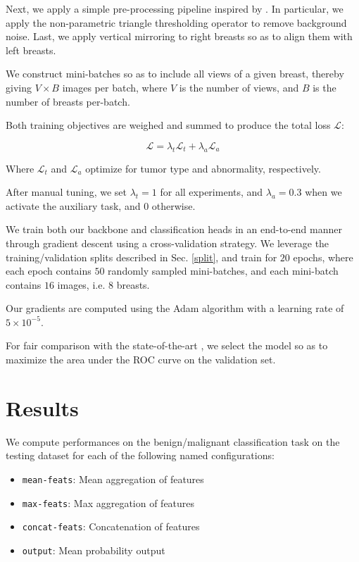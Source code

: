 \documentclass[11pt]{article}
\begin{document}
Next, we apply a simple pre-processing pipeline inspired by \autocite{walsh22}.
In particular, we apply the non-parametric triangle thresholding operator \autocite{zack77}
to remove background noise.
Last, we apply vertical mirroring to right breasts so as to align them with left breasts.

We construct mini-batches so as to include all views of a given breast, thereby
giving \(V \times B\) images per batch, where \(V\) is the number of views,
and \(B\) is the number of breasts per-batch.

Both training objectives are weighed and summed to produce
the total loss \(\mathcal{L}\):

\begin{equation}
\mathcal{L} = \lambda_{t}\mathcal{L}_{t} + \lambda_{a}\mathcal{L}_{a}
\end{equation}

Where \(\mathcal{L}_t\) and \(\mathcal{L}_a\) optimize for tumor type
and abnormality, respectively.

After manual tuning, we set \(\lambda_t=1\) for all experiments,
and \(\lambda_a=0.3\) when we activate the auxiliary task, and \(0\) otherwise.

We train both our backbone and classification heads in an end-to-end manner through
gradient descent using a cross-validation strategy.
We leverage the training/validation splits described in Sec. \ref{split}, and train for
\(20\) epochs, where each epoch contains \(50\) randomly sampled mini-batches,
and each mini-batch contains \(16\) images, i.e. \(8\) breasts.

Our gradients are computed using the Adam algorithm with a learning rate of
\(5 \times 10^{-5}\).

For fair comparison with the state-of-the-art \autocite{walsh22}, we select the model so
as to maximize the area under the ROC curve on the validation set.

\section{Results}
\label{sec:orgaa0ffcc}

We compute performances on the benign/malignant classification task
on the testing dataset for each of the following named configurations:

\begin{itemize}
\item \texttt{mean-feats}: Mean aggregation of features
\item \texttt{max-feats}: Max aggregation of features
\item \texttt{concat-feats}: Concatenation of features
\item \texttt{output}: Mean probability output
\end{itemize}
\end{document}
